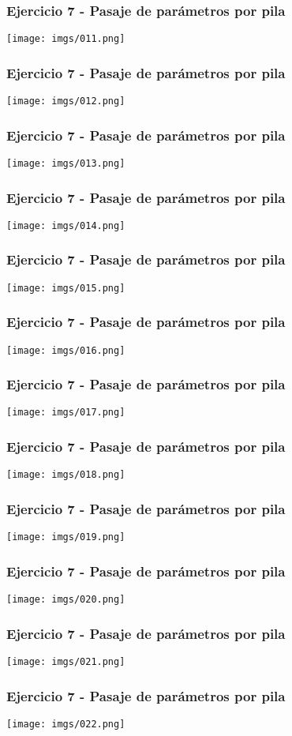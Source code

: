 \documentclass{beamer}
\begin{document}
\begin{frame}
\frametitle{Ejercicio 7 - Pasaje de parámetros por pila}
\texttt{[image: imgs/011.png]}
\end{frame}

\begin{frame}
\frametitle{Ejercicio 7 - Pasaje de parámetros por pila}
\texttt{[image: imgs/012.png]}
\end{frame}

\begin{frame}
\frametitle{Ejercicio 7 - Pasaje de parámetros por pila}
\texttt{[image: imgs/013.png]}
\end{frame}

\begin{frame}
\frametitle{Ejercicio 7 - Pasaje de parámetros por pila}
\texttt{[image: imgs/014.png]}
\end{frame}

\begin{frame}
\frametitle{Ejercicio 7 - Pasaje de parámetros por pila}
\texttt{[image: imgs/015.png]}
\end{frame}

\begin{frame}
\frametitle{Ejercicio 7 - Pasaje de parámetros por pila}
\texttt{[image: imgs/016.png]}
\end{frame}

\begin{frame}
\frametitle{Ejercicio 7 - Pasaje de parámetros por pila}
\texttt{[image: imgs/017.png]}
\end{frame}

\begin{frame}
\frametitle{Ejercicio 7 - Pasaje de parámetros por pila}
\texttt{[image: imgs/018.png]}
\end{frame}

\begin{frame}
\frametitle{Ejercicio 7 - Pasaje de parámetros por pila}
\texttt{[image: imgs/019.png]}
\end{frame}

\begin{frame}
\frametitle{Ejercicio 7 - Pasaje de parámetros por pila}
\texttt{[image: imgs/020.png]}
\end{frame}

\begin{frame}
\frametitle{Ejercicio 7 - Pasaje de parámetros por pila}
\texttt{[image: imgs/021.png]}
\end{frame}

\begin{frame}
\frametitle{Ejercicio 7 - Pasaje de parámetros por pila}
\texttt{[image: imgs/022.png]}
\end{frame}
\end{document}
